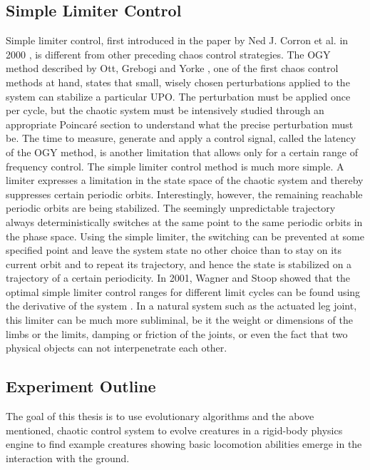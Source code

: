 \documentclass[main]{subfiles}
\begin{document}
\subsection{Simple Limiter Control}

Simple limiter control, first introduced in the paper by Ned J. Corron et al. in 2000 \cite{bib:Corron2000}, is different from other preceding chaos control strategies. %
%
The OGY method described by Ott, Grebogi and Yorke \cite{bib:Ott1990}, one of the first chaos control methods at hand, states that small, wisely chosen perturbations applied to the system can stabilize a particular UPO. %
%
The perturbation must be applied once per cycle, but the chaotic system must be intensively studied through an appropriate Poincaré section to understand what the precise perturbation must be. %
%
The time to measure, generate and apply a control signal, called the latency of the OGY method, is another limitation that allows only for a certain range of frequency control. %
%
The simple limiter control method is much more simple. A limiter expresses a limitation in the state space of the chaotic system and thereby suppresses certain periodic orbits. %
%
%
Interestingly, however, the remaining reachable periodic orbits are being stabilized. %
%
The seemingly unpredictable trajectory always deterministically switches at the same point to the same periodic orbits in the phase space. %
%
Using the simple limiter, the switching can be prevented at some specified point and leave the system state no other choice than to stay on its current orbit and to repeat its trajectory, and hence the state is stabilized on a trajectory of a certain periodicity. %
%
In 2001, Wagner and Stoop showed that the optimal simple limiter control ranges for different limit cycles can be found using the derivative of the system \cite{bib:Wagner2001}. %
%
In a natural system such as the actuated leg joint, this limiter can be much more subliminal, be it the weight or dimensions of the limbs or the limits, damping or friction of the joints, or even the fact that two physical objects can not interpenetrate each other. %
%

\subsection{Experiment Outline}


The goal of this thesis is to use evolutionary algorithms and the above mentioned, chaotic control system to evolve creatures in a rigid-body physics engine to find example creatures showing basic locomotion abilities emerge in the interaction with the ground. %
\end{document}
